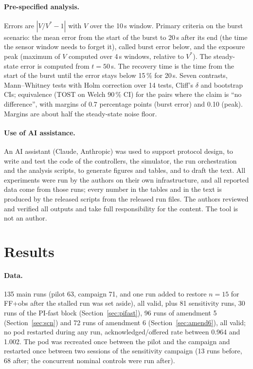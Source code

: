 \documentclass[smallextended]{svjour3}
\begin{document}
\paragraph{Pre-specified analysis.}
Errors are $|V/V^*-1|$ with $V$ over the 10\,s window. Primary criteria on the burst scenario: the mean error from the start of the burst to 20\,s after its end (the time the sensor window needs to forget it), called burst error below, and the exposure peak (maximum of $V$ computed over 4\,s windows, relative to $V^*$). The steady-state error is computed from $t=50$\,s. The recovery time is the time from the start of the burst until the error stays below 15\,\% for 20\,s.
Seven contrasts, Mann--Whitney tests with Holm correction over 14 tests, Cliff's $\delta$ and bootstrap CIs; equivalence (TOST on Welch 90\,\% CI)
for the pairs where the claim is ``no difference'', with margins of 0.7 percentage points (burst error) and 0.10 (peak). Margins are about
half the steady-state noise floor.

\paragraph{Use of AI assistance.}
An AI assistant (Claude, Anthropic) was used to support protocol design, to write and test the code of the controllers, the simulator, the run orchestration and the analysis scripts, to generate figures and tables, and to draft the text. All experiments were run by the authors on their own infrastructure, and all reported data come from those runs; every number in the tables and in the text is produced by the released scripts from the released run files. The authors reviewed and verified all outputs and take full responsibility for the content. The tool is not an author.

\section{Results}\label{sec:results}
\paragraph{Data.}
135 main runs (pilot 63, campaign 71, and one run added to restore $n=15$ for FF+obs after the stalled run was set aside), all valid, plus 81 sensitivity runs, 30 runs of the PI-fast block (Section~\ref{sec:pifast}), 96 runs of amendment 5 (Section~\ref{sec:scn}) and 72 runs of amendment 6 (Section~\ref{sec:amend6}), all valid; no pod restarted during any run, acknowledged/offered rate between 0.964 and 1.002. The pod was recreated once between the pilot and the campaign and restarted once between two sessions of the sensitivity campaign (13 runs before, 68 after; the concurrent nominal controls were run after).
\end{document}
